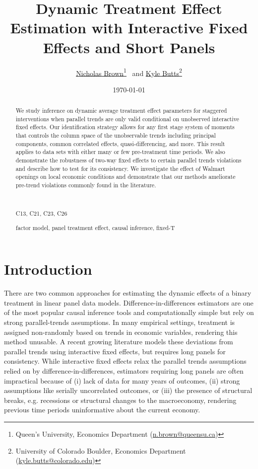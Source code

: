 \documentclass[12pt]{article}
\title{%
    Dynamic Treatment Effect Estimation with Interactive Fixed Effects and Short Panels
}
\author{%
  \href{https://sites.google.com/msu.edu/nicholasbrown}{Nicholas Brown}\thanks{Queen's University, Economics Department (\href{mailto:n.brown@queensu.ca}{n.brown@queensu.ca})}
  \ and 
  \href{https://kylebutts.com/}{Kyle Butts}\thanks{University of Colorado Boulder, Economics Department (\href{mailto:kyle.butts@colorado.edu}{kyle.butts@colorado.edu})}
}
\date{\textsc{\today}}
\begin{document}
\maketitle

\begin{abstract}
  We study inference on dynamic average treatment effect parameters for staggered interventions when parallel trends are only valid conditional on unobserved interactive fixed effects. Our identification strategy allows for any first stage system of moments that controls the column space of the unobservable trends including principal components, common correlated effects, quasi-differencing, and more. This result applies to data sets with either many or few pre-treatment time periods. We also demonstrate the robustness of two-way fixed effects to certain parallel trends violations and describe how to test for its consistency. We investigate the effect of Walmart openings on local economic conditions and demonstrate that our methods ameliorate pre-trend violations commonly found in the literature.
  
  
  \par~\par\noindent
   C13, C21, C23, C26
  \par
   factor model, panel treatment effect, causal inference, fixed-T
  \par\vspace{-2.5mm}
\end{abstract}

\newpage


\section{Introduction}

There are two common approaches for estimating the dynamic effects of a binary treatment in linear panel data models. Difference-in-differences estimators are one of the most popular causal inference tools and computationally simple but rely on strong parallel-trends assumptions. In many empirical settings, treatment is assigned non-randomly based on trends in economic variables, rendering this method unusable. A recent growing literature models these deviations from parallel trends using interactive fixed effects, but requires long panels for consistency. While interactive fixed effects relax the parallel trends assumptions relied on by difference-in-differences, estimators requiring long panels are often impractical because of (i) lack of data for many years of outcomes, (ii) strong assumptions like serially uncorrelated outcomes, or (iii) the presence of structural breaks, e.g. recessions or structural changes to the macroeconomy, rendering previous time periods uninformative about the current economy. 
\end{document}
